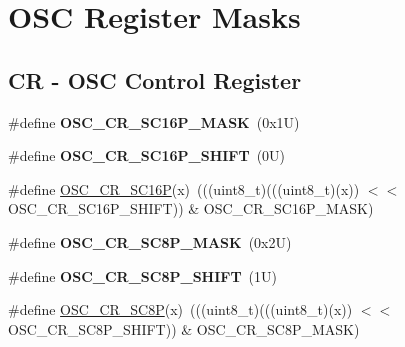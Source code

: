 \hypertarget{group___o_s_c___register___masks}{}\section{O\+SC Register Masks}
\label{group___o_s_c___register___masks}
\subsection*{CR -\/ O\+SC Control Register}
\begin{DoxyCompactItemize}
\item 
\mbox{\label{group___o_s_c___register___masks_ga8c73f0e22875a434f8031986a9e5f8b4}} 
\#define {\bfseries O\+S\+C\+\_\+\+C\+R\+\_\+\+S\+C16\+P\+\_\+\+M\+A\+SK}~(0x1\+U)
\item 
\mbox{\label{group___o_s_c___register___masks_ga4bcf6535cd7e7c4ff935f6b544ca3f9a}} 
\#define {\bfseries O\+S\+C\+\_\+\+C\+R\+\_\+\+S\+C16\+P\+\_\+\+S\+H\+I\+FT}~(0\+U)
\item 
\#define \mbox{\hyperlink{group___o_s_c___register___masks_ga312c9e0891936e3b1a5e0f8f0caca4e9}{O\+S\+C\+\_\+\+C\+R\+\_\+\+S\+C16P}}(x)~(((uint8\+\_\+t)(((uint8\+\_\+t)(x)) $<$$<$ O\+S\+C\+\_\+\+C\+R\+\_\+\+S\+C16\+P\+\_\+\+S\+H\+I\+FT)) \& O\+S\+C\+\_\+\+C\+R\+\_\+\+S\+C16\+P\+\_\+\+M\+A\+SK)
\item 
\mbox{\label{group___o_s_c___register___masks_ga1a5a0db08efaf66c34caf98136cbec11}} 
\#define {\bfseries O\+S\+C\+\_\+\+C\+R\+\_\+\+S\+C8\+P\+\_\+\+M\+A\+SK}~(0x2\+U)
\item 
\mbox{\label{group___o_s_c___register___masks_ga6f17376a1571a200e55cac51d1358503}} 
\#define {\bfseries O\+S\+C\+\_\+\+C\+R\+\_\+\+S\+C8\+P\+\_\+\+S\+H\+I\+FT}~(1\+U)
\item 
\#define \mbox{\hyperlink{group___o_s_c___register___masks_ga7b761b8bfa5dd396029c880348a7f81f}{O\+S\+C\+\_\+\+C\+R\+\_\+\+S\+C8P}}(x)~(((uint8\+\_\+t)(((uint8\+\_\+t)(x)) $<$$<$ O\+S\+C\+\_\+\+C\+R\+\_\+\+S\+C8\+P\+\_\+\+S\+H\+I\+FT)) \& O\+S\+C\+\_\+\+C\+R\+\_\+\+S\+C8\+P\+\_\+\+M\+A\+SK)
\item 
\mbox{\label{group___o_s_c___register___masks_ga18f4104a5a6c0d94f0592ee06732fe03}} 

\end{DoxyCompactItemize}
